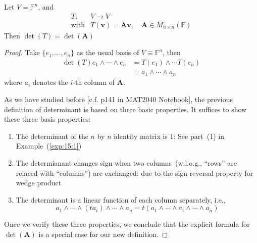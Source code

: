 \begin{theorem}
Let $V=\mathbb{F}^n$, and 
\[
\begin{array}{ll}
T:&V\to V\\
\text{with}&T(\bm v)=\bm A\bm v,\quad\bm A\in M_{n\times n}(\mathbb{F})
\end{array}
\]
Then $\det(T)= \det(\bm A)$
\end{theorem}
\begin{proof}
Take $\{ e_1,\dots, e_n\}$ as the usual basis of $V\equiv\mathbb{F}^n$, then
\begin{align*}
\det(T)e_1\wedge\cdots\wedge e_n &= T( e_1)\wedge\cdots T(e_n)\\
&=a_1\wedge\cdots\wedge a_n
\end{align*}
where $a_i$ denotes the $i$-th column of $\bm A$.

As we have studied before [c.f. p141 in MAT2040 Notebook], the previous definition of determinant is based on three basic properties. It suffices to show these three basis properties:
\begin{enumerate}
\item
The determinant of the $n$ by $n$ identity matrix is 1:
See part~(1) in Example~(\ref{exp:15:1})
\item
The determianant changes sign when two columns~(w.l.o.g., ``rows'' are relaced with 
``columns'') are exchanged:
due to the sign reversal property for wedge product
\item
The determinant is a linear function of each column separately, i.e.,
\[
a_1\wedge\cdots\wedge(ta_i)\wedge\cdots\wedge a_n
=
t(a_1\wedge\cdots\wedge a_i\wedge\cdots\wedge a_n)
\]
\end{enumerate}
Once we verify these three properties, we conclude that the explicit formula for $\det(\bm A)$ is a special case for our new definition.
\end{proof}

